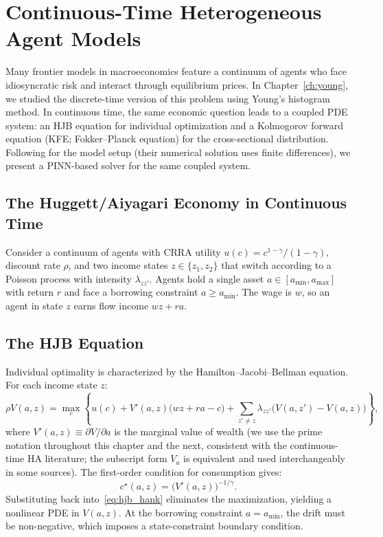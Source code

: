 \documentclass[11pt,a4paper]{report}
\begin{document}
\section{Continuous-Time Heterogeneous Agent Models}
\label{sec:ct_hank}

Many frontier models in macroeconomics feature a continuum of agents who face idiosyncratic risk and interact through equilibrium prices.  In Chapter~\ref{ch:young}, we studied the discrete-time version of this problem using Young's histogram method.  In continuous time, the same economic question leads to a coupled PDE system: an HJB equation for individual optimization and a Kolmogorov forward equation (KFE; Fokker--Planck equation) for the cross-sectional distribution.  Following \citet{achdou2022income} for the model setup (their numerical solution uses finite differences), we present a PINN-based solver for the same coupled system.

\subsection{The Huggett/Aiyagari Economy in Continuous Time}
\label{sec:ct_hank_setup}

Consider a continuum of agents with CRRA utility $u(c) = c^{1-\gamma}/(1-\gamma)$, discount rate $\rho$, and two income states $z \in \{z_1, z_2\}$ that switch according to a Poisson process with intensity $\lambda_{zz'}$.  Agents hold a single asset $a \in [a_{\min}, a_{\max}]$ with return $r$ and face a borrowing constraint $a \geq a_{\min}$.  The wage is $w$, so an agent in state $z$ earns flow income $wz + ra$.

\subsection{The HJB Equation}
\label{sec:ct_hjb}

Individual optimality is characterized by the Hamilton--Jacobi--Bellman equation.  For each income state $z$:
\begin{equation}
\rho V(a,z) = \max_c \left\{u(c) + V'(a,z)\big(w z + r a - c\big) + \sum_{z' \neq z}\lambda_{zz'}\big(V(a,z') - V(a,z)\big)\right\},
\label{eq:hjb_hank}
\end{equation}
where $V'(a,z) \equiv \partial V / \partial a$ is the marginal value of wealth (we use the prime notation throughout this chapter and the next, consistent with the continuous-time HA literature; the subscript form $V_a$ is equivalent and used interchangeably in some sources).  The first-order condition for consumption gives:
\begin{equation}
c^\star(a,z) = \big(V'(a,z)\big)^{-1/\gamma}.
\label{eq:ct_foc}
\end{equation}
Substituting back into~\eqref{eq:hjb_hank} eliminates the maximization, yielding a nonlinear PDE in $V(a,z)$.  At the borrowing constraint $a = a_{\min}$, the drift must be non-negative, which imposes a state-constraint boundary condition.
\end{document}
